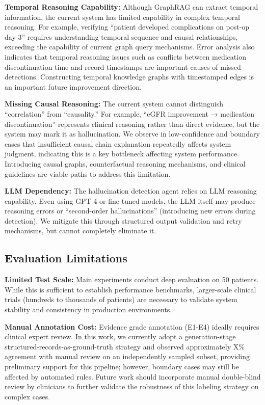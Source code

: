\documentclass[11pt]{article}
\begin{document}
\textbf{Temporal Reasoning Capability:} Although GraphRAG can extract temporal information, the current system has limited capability in complex temporal reasoning. For example, verifying ``patient developed complications on post-op day 3'' requires understanding temporal sequence and causal relationships, exceeding the capability of current graph query mechanisms. Error analysis also indicates that temporal reasoning issues such as conflicts between medication discontinuation time and record timestamps are important causes of missed detections. Constructing temporal knowledge graphs with timestamped edges is an important future improvement direction.

\textbf{Missing Causal Reasoning:} The current system cannot distinguish ``correlation'' from ``causality.'' For example, ``eGFR improvement → medication discontinuation'' represents clinical reasoning rather than direct evidence, but the system may mark it as hallucination. We observe in low-confidence and boundary cases that insufficient causal chain explanation repeatedly affects system judgment, indicating this is a key bottleneck affecting system performance. Introducing causal graphs, counterfactual reasoning mechanisms, and clinical guidelines are viable paths to address this limitation.

\textbf{LLM Dependency:} The hallucination detection agent relies on LLM reasoning capability. Even using GPT-4 or fine-tuned models, the LLM itself may produce reasoning errors or ``second-order hallucinations'' (introducing new errors during detection). We mitigate this through structured output validation and retry mechanisms, but cannot completely eliminate it.

\subsection{Evaluation Limitations}

\textbf{Limited Test Scale:} Main experiments conduct deep evaluation on 50 patients. While this is sufficient to establish performance benchmarks, larger-scale clinical trials (hundreds to thousands of patients) are necessary to validate system stability and consistency in production environments.

\textbf{Manual Annotation Cost:} Evidence grade annotation (E1-E4) ideally requires clinical expert review. In this work, we currently adopt a generation-stage structured-records-as-ground-truth strategy and observed approximately X\% agreement with manual review on an independently sampled subset, providing preliminary support for this pipeline; however, boundary cases may still be affected by automated rules. Future work should incorporate manual double-blind review by clinicians to further validate the robustness of this labeling strategy on complex cases.
\end{document}
